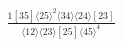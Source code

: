 \documentclass[varwidth, border=5pt]{standalone}
\begin{document}
\begin{my}
$\begin{gathered}
\scriptscriptstyle\frac{1[35]⟨25⟩^2⟨34⟩⟨24⟩[23]}{⟨12⟩⟨23⟩[25]⟨45⟩^4}
\end{gathered}$
\end{my}
\end{document}
